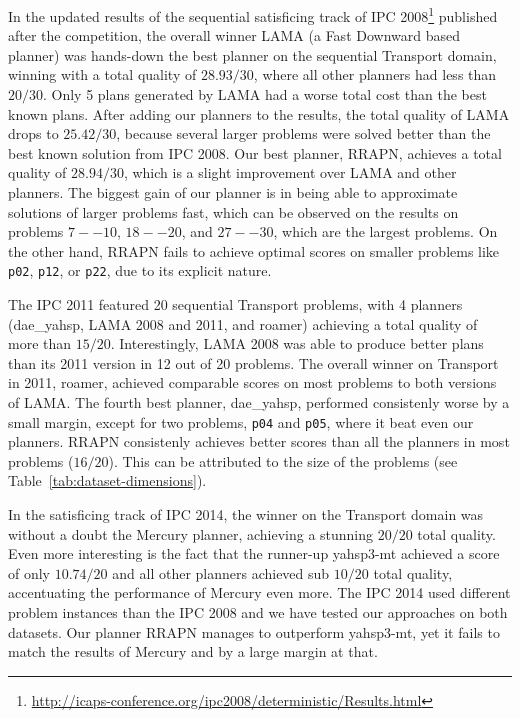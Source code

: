 In the updated results of the sequential satisficing track of IPC 2008\footnote{\url{http://icaps-conference.org/ipc2008/deterministic/Results.html}} published after the competition,
the overall winner LAMA (a Fast Downward based planner)
was hands-down the best planner on the sequential Transport domain, winning
with a total quality of $28.93/30$, where all other planners had less than $20/30$.
Only 5 plans generated by LAMA had a worse total cost than the best known plans. After adding our planners to the results,
the total quality of LAMA drops to $25.42/30$,
because several larger problems were solved better than the
best known solution from IPC 2008.
Our best planner, RRAPN, achieves a total quality of $28.94/30$,
which is a slight improvement over LAMA and other planners. The biggest gain of our planner is in being able to approximate
solutions of larger problems fast, which can be observed on
the results on problems $7--10$, $18--20$, and $27--30$,
which are the largest problems.
On the other hand, RRAPN fails to achieve optimal scores
on smaller problems like \verb+p02+, \verb+p12+, or \verb+p22+,
due to its explicit nature.

The IPC 2011 featured 20 sequential Transport problems,
with 4 planners (dae\_yahsp, LAMA 2008 and 2011, and roamer) achieving a total quality of more than $15/20$.
Interestingly, LAMA 2008 was able to produce better plans than its 2011 version in 12 out of 20 problems. The overall winner on Transport in 2011, roamer, achieved comparable scores on most problems to both versions of LAMA. The fourth best planner, dae\_yahsp, performed consistenly worse by a small margin, except for two problems, \verb+p04+ and \verb+p05+, where it beat even our planners.
RRAPN consistenly achieves better scores than all the planners in most problems ($16/20$). This can be attributed to the size
of the problems (see Table~\ref{tab:dataset-dimensions}).

In the satisficing track of IPC 2014, the winner on the Transport domain
was without a doubt the Mercury planner, achieving
a stunning $20/20$ total quality. Even more interesting is the fact that
the runner-up yahsp3-mt achieved a score of only $10.74/20$
and all other planners achieved sub $10/20$ total quality,
accentuating the performance of Mercury even more.
The IPC 2014 used different problem instances than the IPC 2008
and we have tested our approaches on both datasets.
Our planner RRAPN manages to outperform yahsp3-mt, yet it fails
to match the results
of Mercury and by a large margin at that.

















